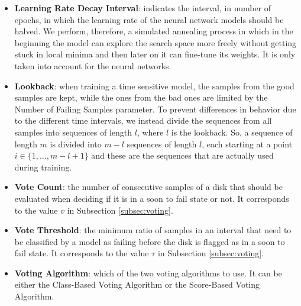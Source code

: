 \begin{itemize}
  \item \textbf{Learning Rate Decay Interval}: indicates the interval, in number of epochs, in which the learning rate of the neural network models should be halved.
  We perform, therefore, a simulated annealing process in which in the beginning the model can explore the search space more freely without getting stuck in local minima and then later on it can fine-tune its weights.
  It is only taken into account for the neural networks.

  \item \textbf{Lookback}: when training a time sensitive model, the samples from the good samples are kept, while the ones from the bad ones are limited by the Number of Failing Samples parameter.
  To prevent differences in behavior due to the different time intervals, we instead divide the sequences from all samples into sequences of length $l$, where $l$ is the lookback.
  So, a sequence of length $m$ is divided into $m-l$ sequences of length $l$, each starting at a point $i \in \{1,\dots,m-l+1\}$ and these are the sequences that are actually used during training.

  \item \textbf{Vote Count}: the number of consecutive samples of a disk that should be evaluated when deciding if it is in a soon to fail state or not.
  It corresponds to the value $v$ in Subsection \ref{subsec:voting}.

  \item \textbf{Vote Threshold}: the minimum ratio of samples in an interval that need to be classified by a model as failing before the disk is flagged as in a soon to fail state.
  It corresponds to the value $\tau$ in Subsection \ref{subsec:voting}.

  \item \textbf{Voting Algorithm}: which of the two voting algorithms to use.
  It can be either the Class-Based Voting Algorithm or the Score-Based Voting Algorithm.
  
\end{itemize}